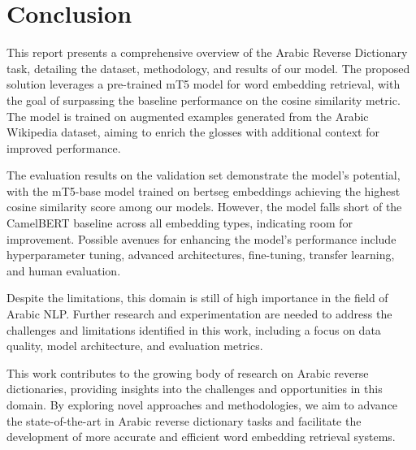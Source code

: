 \documentclass[15pt]{article}
\begin{document}
\newpage

\section*{Conclusion}

This report presents a comprehensive overview of the Arabic Reverse Dictionary task, detailing the dataset, methodology, and results of our model. The proposed solution leverages a pre-trained mT5 model for word embedding retrieval, with the goal of surpassing the baseline performance on the cosine similarity metric. The model is trained on augmented examples generated from the Arabic Wikipedia dataset, aiming to enrich the glosses with additional context for improved performance.

The evaluation results on the validation set demonstrate the model's potential, with the mT5-base model trained on bertseg embeddings achieving the highest cosine similarity score among our models. However, the model falls short of the CamelBERT baseline across all embedding types, indicating room for improvement. Possible avenues for enhancing the model's performance include hyperparameter tuning, advanced architectures, fine-tuning, transfer learning, and human evaluation.

Despite the limitations, this domain is still of high importance in the field of Arabic NLP. Further research and experimentation are needed to address the challenges and limitations identified in this work, including a focus on data quality, model architecture, and evaluation metrics.

This work contributes to the growing body of research on Arabic reverse dictionaries, providing insights into the challenges and opportunities in this domain. By exploring novel approaches and methodologies, we aim to advance the state-of-the-art in Arabic reverse dictionary tasks and facilitate the development of more accurate and efficient word embedding retrieval systems.

\newpage

\printbibliography[title={References}]\label{lastpage}
\end{document}
